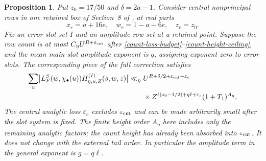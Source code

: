 \documentclass[10pt,reqno,a4paper]{amsart}
\newtheorem{proposition}[theorem]{Proposition}
\theoremstyle{remark}
\newcommand{\eps}{\varepsilon}
\begin{document}
\begin{proposition}\label{central-joint}
Put $z_0=17/50$ and $\delta=2a-1$. Consider central nonprincipal
rows in one retained box of Section~8 of \cite{q30}, at real parts
\[
                  x_r=a+16e,\quad w_r=1-a-6e,\quad z_r=z_0.
\]
Fix an error-slot set $I$ and an amplitude row set at a retained
point. Suppose the row count is at most $C_\eta U^{R+\eps_{\rm cnt}}$
after \eqref{count-loss-budget}--\eqref{count-height-ceiling}, and the mean
main-slot amplitude exponent is $q$, assigning exponent zero to
error slots. The corresponding piece of the full correction satisfies
\begin{equation}\label{joint-bound}
\begin{aligned}
 \sum_u\bigl|L_F^S(w,\chi_\bullet(u))
                    H^{(I)}_{\eta,u,Z}(s,w,z)\bigr|
 \ll_\eta{}&U^{R+\delta/2+\eps_{\rm cnt}+\eps_c}\\
 &\times Z^{\ell(z_0-1/2)+q\ell+\eps_c}
                      (1+T_1)^{A_\eta}.
\end{aligned}
\end{equation}
The central analytic loss $\eps_c$ excludes $\eps_{\rm cnt}$ and
can be made arbitrarily small after the slot system is fixed.
The finite height order $A_\eta$ here includes only the remaining
analytic factors; the count height has already been absorbed into
$\eps_{\rm cnt}$. It does not change with the external tail order. In particular the amplitude term in the general exponent
is $g=q\ell$.
\end{proposition}
\end{document}
